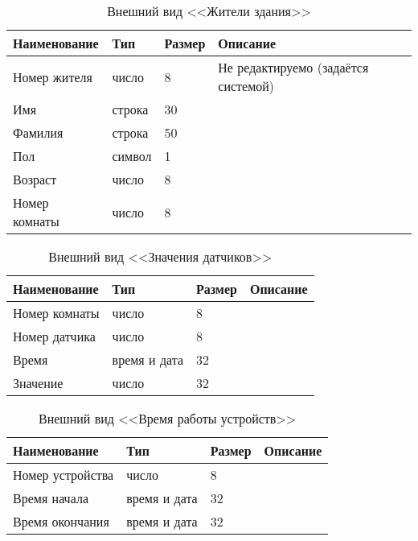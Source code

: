           \begin{table}[h!]
            \centering
            \caption{Внешний вид <<Жители здания>>}
            \label{sensor:size}
            \begin{tabular}{|l|l|l|l|}
            \hline
            Наименование & Тип & Размер & Описание \\ \hline
            Номер жителя & число & 8 & Не редактируемо (задаётся системой) \\ \hline
            Имя & строка & 30 & \\ \hline
            Фамилия & строка & 50 & \\ \hline
            Пол & символ & 1 & \\ \hline
            Возраст & число & 8 & \\ \hline
            Номер комнаты & число & 8 & \\ \hline
            \end{tabular}
          \end{table}
          \begin{table}[h!]
            \centering
            \caption{Внешний вид <<Значения датчиков>>}
            \label{room:size}
            \begin{tabular}{|l|l|l|l|}
            \hline
            Наименование & Тип & Размер & Описание \\ \hline
            Номер комнаты & число & 8 & \\ \hline
            Номер датчика & число & 8 & \\ \hline
            Время & время и дата & 32 & \\ \hline
            Значение & число & 32 & \\ \hline
            \end{tabular}
          \end{table}
          \begin{table}[h!]
            \centering
            \caption{Внешний вид <<Время работы устройств>>}
            \label{room:size}
            \begin{tabular}{|l|l|l|l|}
            \hline
            Наименование & Тип & Размер & Описание \\ \hline
            Номер устройства & число & 8 & \\ \hline
            Время начала & время и дата & 32 &          \\ \hline
            Время окончания & время и дата & 32 &          \\ \hline
            \end{tabular}
          \end{table}
